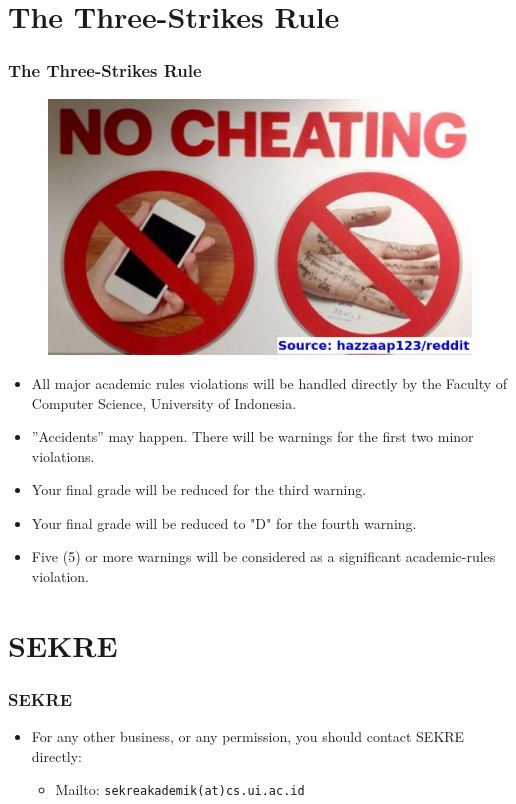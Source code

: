 \documentclass[aspectratio=169, xcolor=table, notheorems, hyperref={pdfpagelabels=false}]{beamer}
\begin{document}
\section{The Three-Strikes Rule}
\begin{frame}[fragile]
\frametitle{The Three-Strikes Rule}

\begin{figure}
\includegraphics[width=0.30\linewidth]{os-cheating}
\end{figure}

\begin{itemize}
\item All major academic rules violations will be handled directly by the Faculty of Computer Science,
University of Indonesia.
\item ''Accidents'' may happen. There will be warnings for the first two minor violations.
\item Your final grade will be reduced for the third warning.
\item Your final grade will be reduced to "D" for the fourth warning.
\item Five (5) or more warnings will be considered as a significant academic-rules violation.
\end{itemize}

\end{frame}

\section{SEKRE}
\frametitle{SEKRE}
\begin{frame}[fragile]
\begin{itemize}
\item For any other business, or any permission, you should contact SEKRE directly:
\begin{itemize}
\item Mailto: \texttt{sekreakademik(at)cs.ui.ac.id}
\end{itemize}
\end{itemize}
\end{frame}
\end{document}
